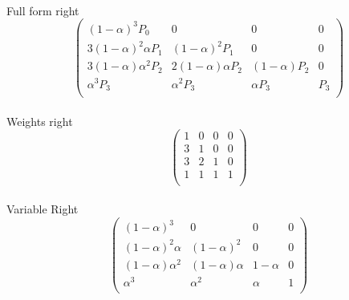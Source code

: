 \\
Full form right
\begin{equation*}
    \left(
    \begin{array}{cccc}
        (1-\alpha )^3 P_0           & 0                         & 0               & 0   \\
        3 (1-\alpha )^2 \alpha  P_1 & (1-\alpha )^2 P_1         & 0               & 0   \\
        3 (1-\alpha ) \alpha ^2 P_2 & 2 (1-\alpha ) \alpha  P_2 & (1-\alpha ) P_2 & 0   \\
        \alpha ^3 P_3               & \alpha ^2 P_3             & \alpha  P_3     & P_3 \\
    \end{array}
    \right)
\end{equation*}
\\
Weights right
\begin{equation*}
    \left(
    \begin{array}{cccc}
        1 & 0 & 0 & 0 \\
        3 & 1 & 0 & 0 \\
        3 & 2 & 1 & 0 \\
        1 & 1 & 1 & 1 \\
    \end{array}
    \right)
\end{equation*}
\\
Variable Right
\begin{equation*}
    \left(
    \begin{array}{cccc}
        (1-\alpha )^3         & 0                  & 0        & 0 \\
        (1-\alpha )^2 \alpha  & (1-\alpha )^2      & 0        & 0 \\
        (1-\alpha ) \alpha ^2 & (1-\alpha ) \alpha & 1-\alpha & 0 \\
        \alpha ^3             & \alpha ^2          & \alpha   & 1 \\
    \end{array}
    \right)
\end{equation*}
